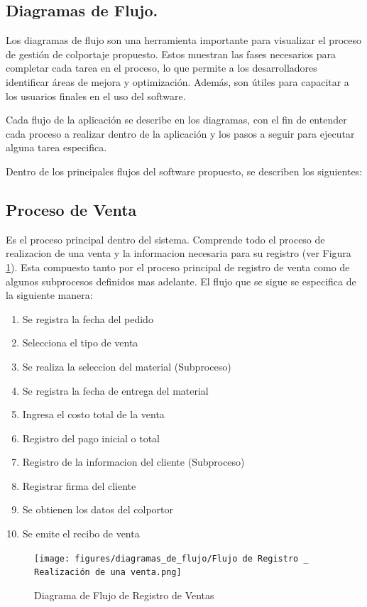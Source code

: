 \documentclass[runningheads]{llncs}
\begin{document}
\subsection{Diagramas de Flujo.}
Los diagramas de flujo son una herramienta importante para visualizar el proceso de gestión de colportaje propuesto. Estos muestran las fases necesarios para completar cada tarea en el proceso, lo que permite a los desarrolladores identificar áreas de mejora y optimización. Además, son útiles para capacitar a los usuarios finales en el uso del software.

Cada flujo de la aplicación se describe en los diagramas, con el fin de entender cada proceso a realizar dentro de la aplicación y los pasos a seguir para ejecutar alguna tarea especifica.

Dentro de los principales flujos del software propuesto, se describen los siguientes:

\subsection*{Proceso de Venta}
Es el proceso principal dentro del sistema. Comprende todo el proceso de realizacion de una venta y la informacion necesaria para su registro (ver Figura \ref{fig1}).
Esta compuesto tanto por el proceso principal de registro de venta como de algunos subprocesos definidos mas adelante.
El flujo que se sigue se especifica de la siguiente manera:
\begin{enumerate}
    \item Se registra la fecha del pedido
    \item Selecciona el tipo de venta 
    \item Se realiza la seleccion del material (Subproceso)
    \item Se registra la fecha de entrega del material
    \item Ingresa el costo total de la venta
    \item Registro del pago inicial o total
    \item Registro de la informacion del cliente (Subproceso)
    \item Registrar firma del cliente
    \item Se obtienen los datos del colportor
    \item Se emite el recibo de venta
\end{enumerate}
\begin{figure}[H]
	\centering\captionsetup{width=0.8\textwidth}
	\texttt{[image: figures/diagramas\_de\_flujo/Flujo de Registro \_ Realización de una venta.png]}
	\caption{Diagrama de Flujo de Registro de Ventas} \label{fig1}
\end{figure}
\end{document}
